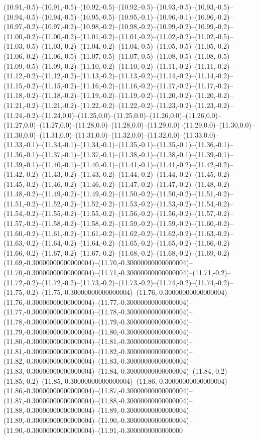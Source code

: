(10.91,-0.5)--(10.91,-0.5)--(10.92,-0.5)--(10.92,-0.5)--(10.93,-0.5)--(10.93,-0.5)--(10.94,-0.5)--(10.94,-0.5)--(10.95,-0.5)--(10.95,-0.1)--(10.96,-0.1)--(10.96,-0.2)--(10.97,-0.2)--(10.97,-0.2)--(10.98,-0.2)--(10.98,-0.2)--(10.99,-0.2)--(10.99,-0.2)--(11.00,-0.2)--(11.00,-0.2)--(11.01,-0.2)--(11.01,-0.2)--(11.02,-0.2)--(11.02,-0.5)--(11.03,-0.5)--(11.03,-0.2)--(11.04,-0.2)--(11.04,-0.5)--(11.05,-0.5)--(11.05,-0.2)--(11.06,-0.2)--(11.06,-0.5)--(11.07,-0.5)--(11.07,-0.5)--(11.08,-0.5)--(11.08,-0.5)--(11.09,-0.5)--(11.09,-0.2)--(11.10,-0.2)--(11.10,-0.2)--(11.11,-0.2)--(11.11,-0.2)--(11.12,-0.2)--(11.12,-0.2)--(11.13,-0.2)--(11.13,-0.2)--(11.14,-0.2)--(11.14,-0.2)--(11.15,-0.2)--(11.15,-0.2)--(11.16,-0.2)--(11.16,-0.2)--(11.17,-0.2)--(11.17,-0.2)--(11.18,-0.2)--(11.18,-0.2)--(11.19,-0.2)--(11.19,-0.2)--(11.20,-0.2)--(11.20,-0.2)--(11.21,-0.2)--(11.21,-0.2)--(11.22,-0.2)--(11.22,-0.2)--(11.23,-0.2)--(11.23,-0.2)--(11.24,-0.2)--(11.24,0.0)--(11.25,0.0)--(11.25,0.0)--(11.26,0.0)--(11.26,0.0)--(11.27,0.0)--(11.27,0.0)--(11.28,0.0)--(11.28,0.0)--(11.29,0.0)--(11.29,0.0)--(11.30,0.0)--(11.30,0.0)--(11.31,0.0)--(11.31,0.0)--(11.32,0.0)--(11.32,0.0)--(11.33,0.0)--(11.33,-0.1)--(11.34,-0.1)--(11.34,-0.1)--(11.35,-0.1)--(11.35,-0.1)--(11.36,-0.1)--(11.36,-0.1)--(11.37,-0.1)--(11.37,-0.1)--(11.38,-0.1)--(11.38,-0.1)--(11.39,-0.1)--(11.39,-0.1)--(11.40,-0.1)--(11.40,-0.1)--(11.41,-0.1)--(11.41,-0.2)--(11.42,-0.2)--(11.42,-0.2)--(11.43,-0.2)--(11.43,-0.2)--(11.44,-0.2)--(11.44,-0.2)--(11.45,-0.2)--(11.45,-0.2)--(11.46,-0.2)--(11.46,-0.2)--(11.47,-0.2)--(11.47,-0.2)--(11.48,-0.2)--(11.48,-0.2)--(11.49,-0.2)--(11.49,-0.2)--(11.50,-0.2)--(11.50,-0.2)--(11.51,-0.2)--(11.51,-0.2)--(11.52,-0.2)--(11.52,-0.2)--(11.53,-0.2)--(11.53,-0.2)--(11.54,-0.2)--(11.54,-0.2)--(11.55,-0.2)--(11.55,-0.2)--(11.56,-0.2)--(11.56,-0.2)--(11.57,-0.2)--(11.57,-0.2)--(11.58,-0.2)--(11.58,-0.2)--(11.59,-0.2)--(11.59,-0.2)--(11.60,-0.2)--(11.60,-0.2)--(11.61,-0.2)--(11.61,-0.2)--(11.62,-0.2)--(11.62,-0.2)--(11.63,-0.2)--(11.63,-0.2)--(11.64,-0.2)--(11.64,-0.2)--(11.65,-0.2)--(11.65,-0.2)--(11.66,-0.2)--(11.66,-0.2)--(11.67,-0.2)--(11.67,-0.2)--(11.68,-0.2)--(11.68,-0.2)--(11.69,-0.2)--(11.69,-0.30000000000000004)--(11.70,-0.30000000000000004)--(11.70,-0.30000000000000004)--(11.71,-0.30000000000000004)--(11.71,-0.2)--(11.72,-0.2)--(11.72,-0.2)--(11.73,-0.2)--(11.73,-0.2)--(11.74,-0.2)--(11.74,-0.2)--(11.75,-0.2)--(11.75,-0.30000000000000004)--(11.76,-0.30000000000000004)--(11.76,-0.30000000000000004)--(11.77,-0.30000000000000004)--(11.77,-0.30000000000000004)--(11.78,-0.30000000000000004)--(11.78,-0.30000000000000004)--(11.79,-0.30000000000000004)--(11.79,-0.30000000000000004)--(11.80,-0.30000000000000004)--(11.80,-0.30000000000000004)--(11.81,-0.30000000000000004)--(11.81,-0.30000000000000004)--(11.82,-0.30000000000000004)--(11.82,-0.30000000000000004)--(11.83,-0.30000000000000004)--(11.83,-0.30000000000000004)--(11.84,-0.30000000000000004)--(11.84,-0.2)--(11.85,-0.2)--(11.85,-0.30000000000000004)--(11.86,-0.30000000000000004)--(11.86,-0.30000000000000004)--(11.87,-0.30000000000000004)--(11.87,-0.30000000000000004)--(11.88,-0.30000000000000004)--(11.88,-0.30000000000000004)--(11.89,-0.30000000000000004)--(11.89,-0.30000000000000004)--(11.90,-0.30000000000000004)--(11.90,-0.30000000000000004)--(11.91,-0.3000000000000000